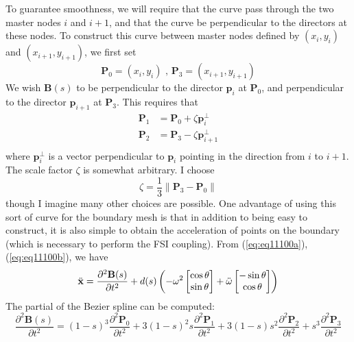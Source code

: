 \documentclass{article}
\begin{document}
To guarantee smoothness, we will require that the curve pass through the two master nodes $i$ and $i+1$, and that the curve be perpendicular to the directors at these nodes.
To construct this curve between master nodes defined by $(x_i, y_i)$ and $(x_{i+1}, y_{i+1})$, we first set 
\[ \mathbf{P}_0 = (x_i, y_i) \mbox{ , } \mathbf{P}_3 = (x_{i+1}, y_{i+1}) \]
We wish $\mathbf{B}(s)$ to be perpendicular to the director $\mathbf{p}_i$ at $\mathbf{P}_0$, and perpendicular to the director $\mathbf{p}_{i+1}$ at $\mathbf{P}_3$.
This requires that 
\begin{subequations}
\label{equations4}
\begin{align}
 \label{eq:eq10400a}
 \mathbf{P}_1 &= \mathbf{P}_0 + \zeta \mathbf{p}_i^{\bot} \\
 \label{eq:eq10400b}
 \mathbf{P}_2 &= \mathbf{P}_3 - \zeta \mathbf{p}_{i+1}^{\bot} \\
\end{align}
\end{subequations}
where $\mathbf{p}_i^{\bot}$ is a vector perpendicular to $\mathbf{p}_i$ pointing in the direction from $i$ to $i+1$.  
The scale factor $\zeta$ is somewhat arbitrary.  
I choose
\begin{equation}  \zeta = \frac{1}{3}\| \mathbf{P}_3 - \mathbf{P}_0 \| \label{eq:eq10500} \end{equation}
though I imagine many other choices are possible.
One advantage of using this sort of curve for the boundary mesh is that in addition to being easy to construct, it is also simple to obtain the acceleration of points on the boundary (which is necessary to perform the FSI coupling).
From (\ref{eq:eq11100a}), (\ref{eq:eq11100b}), we have
\begin{equation} \ddot{\bf x} = \frac{\partial^2 \mathbf{B}(s)}{\partial t^2} + d(s)\left( -\omega^2\begin{bmatrix} \cos \theta \\ \sin \theta \end{bmatrix} + \ddot{\omega} \begin{bmatrix} -\sin \theta \\ \cos \theta \end{bmatrix} \right) \label{eq:eq10550} \end{equation}
The partial of the Bezier spline can be computed:
\begin{equation}  \frac{\partial^2 \mathbf{B}(s)}{\partial t^2} = (1-s)^3\frac{\partial^2 \mathbf{P}_0}{\partial t^2} + 3(1-s)^2s\frac{\partial^2 \mathbf{P}_1}{\partial t^2} + 3(1-s)s^2\frac{\partial^2 \mathbf{P}_2}{\partial t^2}+s^3\frac{\partial^2 \mathbf{P}_3}{\partial t^2} \label{eq:eq10600} \end{equation}
\end{document}
